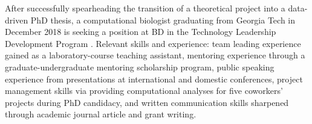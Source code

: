

\begin{cventries}


\fontsize{10pt}{1em}\bodyfontlight\upshape\color{black}\justify
After successfully spearheading the transition of a theoretical project into a data-driven PhD thesis, a computational biologist graduating from Georgia Tech in December 2018 is seeking a position at BD in the Technology Leadership Development Program . Relevant skills and experience: team leading experience gained as a laboratory-course teaching assistant, mentoring experience through a graduate-undergraduate mentoring scholarship program, public speaking experience from presentations at international and domestic conferences, project management skills via providing computational analyses for five coworkers' projects during PhD candidacy, and written communication skills sharpened through academic journal article and grant writing.
    
\vspace{-2.0mm}
\end{cventries}
